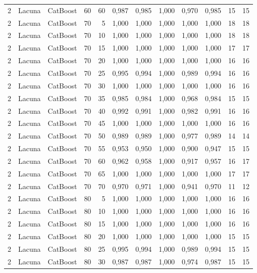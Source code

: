 \begin{longtable}{@{}rllrrrrrrrrr@{}}
2 & Lacuna & CatBoost & 60 & 60 & 0,987 & 0,985 & 1,000 & 0,970 & 0,985 & 15 & 15 \\
2 & Lacuna & CatBoost & 70 & 5 & 1,000 & 1,000 & 1,000 & 1,000 & 1,000 & 18 & 18 \\
2 & Lacuna & CatBoost & 70 & 10 & 1,000 & 1,000 & 1,000 & 1,000 & 1,000 & 18 & 18 \\
2 & Lacuna & CatBoost & 70 & 15 & 1,000 & 1,000 & 1,000 & 1,000 & 1,000 & 17 & 17 \\
2 & Lacuna & CatBoost & 70 & 20 & 1,000 & 1,000 & 1,000 & 1,000 & 1,000 & 16 & 16 \\
2 & Lacuna & CatBoost & 70 & 25 & 0,995 & 0,994 & 1,000 & 0,989 & 0,994 & 16 & 16 \\
2 & Lacuna & CatBoost & 70 & 30 & 1,000 & 1,000 & 1,000 & 1,000 & 1,000 & 16 & 16 \\
2 & Lacuna & CatBoost & 70 & 35 & 0,985 & 0,984 & 1,000 & 0,968 & 0,984 & 15 & 15 \\
2 & Lacuna & CatBoost & 70 & 40 & 0,992 & 0,991 & 1,000 & 0,982 & 0,991 & 16 & 16 \\
2 & Lacuna & CatBoost & 70 & 45 & 1,000 & 1,000 & 1,000 & 1,000 & 1,000 & 16 & 16 \\
2 & Lacuna & CatBoost & 70 & 50 & 0,989 & 0,989 & 1,000 & 0,977 & 0,989 & 14 & 14 \\
2 & Lacuna & CatBoost & 70 & 55 & 0,953 & 0,950 & 1,000 & 0,900 & 0,947 & 15 & 15 \\
2 & Lacuna & CatBoost & 70 & 60 & 0,962 & 0,958 & 1,000 & 0,917 & 0,957 & 16 & 17 \\
2 & Lacuna & CatBoost & 70 & 65 & 1,000 & 1,000 & 1,000 & 1,000 & 1,000 & 17 & 17 \\
2 & Lacuna & CatBoost & 70 & 70 & 0,970 & 0,971 & 1,000 & 0,941 & 0,970 & 11 & 12 \\
2 & Lacuna & CatBoost & 80 & 5 & 1,000 & 1,000 & 1,000 & 1,000 & 1,000 & 16 & 16 \\
2 & Lacuna & CatBoost & 80 & 10 & 1,000 & 1,000 & 1,000 & 1,000 & 1,000 & 16 & 16 \\
2 & Lacuna & CatBoost & 80 & 15 & 1,000 & 1,000 & 1,000 & 1,000 & 1,000 & 16 & 16 \\
2 & Lacuna & CatBoost & 80 & 20 & 1,000 & 1,000 & 1,000 & 1,000 & 1,000 & 15 & 15 \\
2 & Lacuna & CatBoost & 80 & 25 & 0,995 & 0,994 & 1,000 & 0,989 & 0,994 & 15 & 15 \\
2 & Lacuna & CatBoost & 80 & 30 & 0,987 & 0,987 & 1,000 & 0,974 & 0,987 & 15 & 15 \\

\end{longtable}
